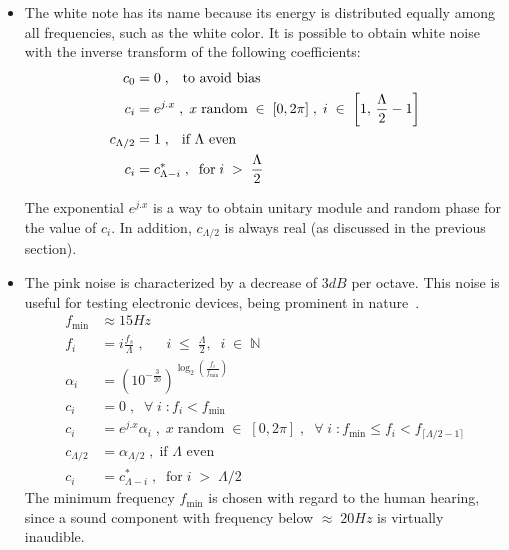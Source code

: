 \begin{itemize}
 \item The white note has its name because its energy is distributed equally among all frequencies, such as the white color. It is possible to obtain white noise with the inverse transform of the following coefficients:
\begin{equation}\label{eq:branco}
 \begin{split}
 c_0 & =0 \;\text{,\quad to avoid bias} \\
 c_i & =e^{j.x}\;,\; x \; \text{random} \; \in \; [0,2\pi]\;,\; i \; \in \; \left[1, \, \frac{\Lambda}{2}-1\right] \\
 c_{\Lambda/2} & = 1 \; \text{, \; if $\Lambda$ even}\\ 
 c_i & = c_{\Lambda - i}^*\;,\;\; \text{for}\;  i \; > \;  \frac{\Lambda}{2}
 \end{split}
\end{equation}

The exponential $e^{j.x}$ is a way to obtain unitary module and random phase for the value of $c_i$. In addition, $c_{\Lambda/2}$ is always real (as discussed in the previous section).

 \item The pink noise is characterized by a decrease of $3dB$ per octave. This noise is useful for testing electronic devices, being prominent in nature~\cite{Roederer}. 
\begin{equation}\label{eq:rosa}
\begin{split}
	f_{\text{min}} & \approx 15 Hz \\
	f_i  &= i \frac{f_s}{\Lambda} \;, \;\; \quad i \;\leq\; \frac{\Lambda}{2},\;\; i\;\in\;\mathbb{N}  \\
	\alpha_i & = \left(10^{-\frac{3}{20}}\right)^{\log _2 \left ( \frac{f_i}{f_{\text{min}}} \right )}  \\
	c_i & =0\;,\;\; \forall \; i \; : f_i<f_{\text{min}} \\
	c_i & =e^{j.x} \alpha_i\;, \; x \; \text{random} \; \in \; [0,2\pi]\;,\;\; \forall \; i \; : f_{\text{min}} \le f_i < f_{\lceil \Lambda/2-1 \rceil}  \\
	c_{\Lambda/2} & = \alpha_{\Lambda/2}\;, \; \text{if $\Lambda$ even} \\ 
	c_i & = c_{\Lambda - i}^*\;,\;\; \text{for}\;  i \; > \;  \Lambda/2 \qquad \qquad
\end{split}
\end{equation}
The minimum frequency $f_{\text{min}}$ is chosen with regard to the human hearing, since a sound component with frequency below $\approx\; 20Hz$ is virtually inaudible.


\end{itemize}

